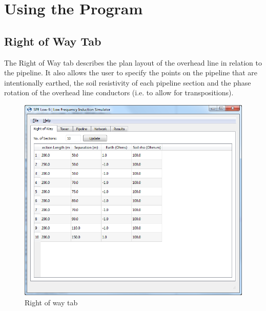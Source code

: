 \documentclass{article}
\begin{document}
\newpage
\section{Using the Program}
\subsection{Right of Way Tab}
The Right of Way tab describes the plan layout of the overhead line in relation to the pipeline. It also allows the user to specify the points on the pipeline that are intentionally earthed, the soil resistivity of each pipeline section and the phase rotation of the overhead line conductors (i.e. to allow for transpositions). 

\begin{figure}[!htp]
\begin{center}
\caption{Right of way tab}
\label{fig:right_of_way}
\includegraphics[width=0.9\linewidth]{./Figures/right_of_way.png}
\end{center}
\end{figure}
\end{document}
